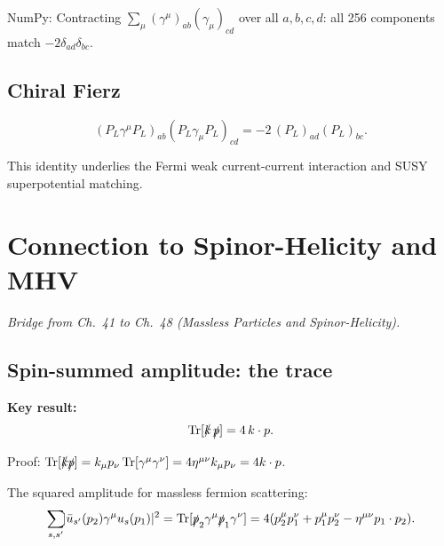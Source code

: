 \documentclass[12pt]{article}
\newcommand{\verified}[1]{\textcolor{verifygreen}{\checkmark\; #1}}
\DeclareMathOperator\Tr{Tr}
\begin{document}
\begin{mdframed}[backgroundcolor=green!5]
\verified{NumPy:} Contracting $\sum_\mu (\gamma^\mu)_{ab}(\gamma_\mu)_{cd}$
over all $a,b,c,d$: all 256 components match $-2\delta_{ad}\delta_{bc}$. \checkmark
\end{mdframed}

\subsection{Chiral Fierz}

\begin{mdframed}[backgroundcolor=blue!5]
\begin{equation}\label{eq:fierz-LL}
  (P_L\gamma^\mu P_L)_{ab}(P_L\gamma_\mu P_L)_{cd}
  = -2\,(P_L)_{ad}(P_L)_{bc}.
\end{equation}
\end{mdframed}

This identity underlies the Fermi weak current-current interaction and SUSY
superpotential matching.

\section{Connection to Spinor-Helicity and MHV}

\textit{Bridge from Ch.~41 to Ch.~48 (Massless Particles and Spinor-Helicity).}

\subsection{Spin-summed amplitude: the trace}

\begin{mdframed}[backgroundcolor=blue!5]
\textbf{Key result:}
\begin{equation}\label{eq:trace-pp}
  \Tr[\slashed{k}\,\slashed{p}] = 4\,k\cdot p.
\end{equation}
\end{mdframed}

Proof: $\Tr[\slashed{k}\slashed{p}] = k_\mu p_\nu \Tr[\gamma^\mu\gamma^\nu]
= 4\eta^{\mu\nu}k_\mu p_\nu = 4k\cdot p$.

The squared amplitude for massless fermion scattering:
\begin{equation}
  \sum_{s,s'}\!\! |\bar u_{s'}(p_2)\gamma^\mu u_s(p_1)|^2
  = \Tr[\slashed{p}_2\gamma^\mu\slashed{p}_1\gamma^\nu]
  = 4(p_2^\mu p_1^\nu + p_1^\mu p_2^\nu - \eta^{\mu\nu}p_1\cdot p_2).
\end{equation}
\end{document}
